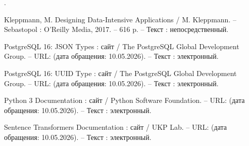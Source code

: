 \begin{list}{.}
\item Kleppmann, M. Designing Data-Intensive Applications / M. Kleppmann. – Sebastopol : O'Reilly Media, 2017. – 616 p. – Текст : непосредственный.

\item PostgreSQL 16: JSON Types : сайт / The PostgreSQL Global Development Group. – URL:  (дата обращения: 10.05.2026). – Текст : электронный.

\item PostgreSQL 16: UUID Type : сайт / The PostgreSQL Global Development Group. – URL:  (дата обращения: 10.05.2026). – Текст : электронный.

\item Python 3 Documentation : сайт / Python Software Foundation. – URL:  (дата обращения: 10.05.2026). – Текст : электронный.

\item Sentence Transformers Documentation : сайт / UKP Lab. – URL:  (дата обращения: 10.05.2026). – Текст : электронный.

\end{list}
\endgroup


